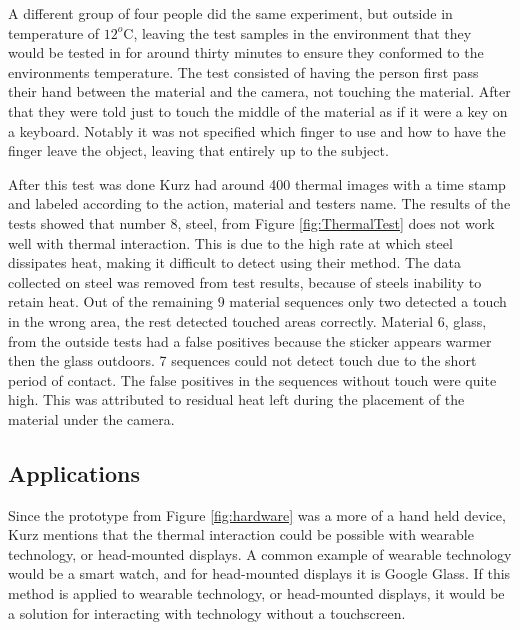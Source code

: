 \documentclass{sig-alternate}
\begin{document}
A different group of four people did the same experiment, but outside in temperature of \(12^o\)C, leaving the test samples in the environment that they would be tested in for around thirty minutes to ensure they conformed to the environments temperature. The test consisted of having the person first pass their hand between the material and the camera, not touching the material. After that they were told just to touch the middle of the material as if it were a key on a keyboard. Notably it was not specified which finger to use and how to have the finger leave the object, leaving that entirely up to the subject. 

After this test was done Kurz had around 400 thermal images with a time stamp and labeled according to the action, material and testers name. The results of the tests showed that number 8, steel, from Figure \ref{fig:ThermalTest} does not work well with thermal interaction. This is due to the high rate at which steel dissipates heat, making it difficult to detect using their method. The data collected on steel was removed from test results, because of steels inability to retain heat. Out of the remaining 9 material sequences only two detected a touch in the wrong area, the rest detected touched areas correctly. Material 6, glass, from the outside tests had a false positives because the sticker appears warmer then the glass outdoors. 7 sequences could not detect touch due to the short period of contact. The false positives in the sequences without touch were quite high. This was attributed to residual heat left during the placement of the material under the camera.

\subsection{Applications}
\label{Thermal Applications}
Since the prototype from Figure \ref{fig:hardware} was a more of a hand held device, Kurz mentions that the thermal interaction could be possible with wearable technology, or head-mounted displays. A common example of wearable technology would be a smart watch, and for head-mounted displays it is Google Glass. If this method is applied to wearable technology, or head-mounted displays, it would be a solution for interacting with technology without a touchscreen.     
\end{document}
